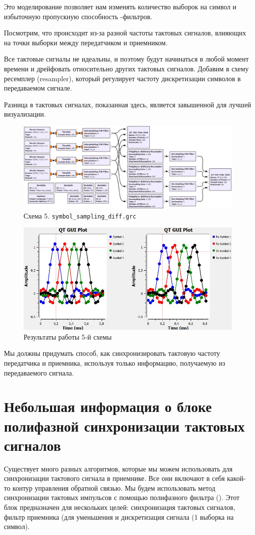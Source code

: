 \documentclass[a4paper, 12pt]{report}
\begin{document}
	Это моделирование позволяет нам изменять количество выборок на символ и избыточную пропускную способность -фильтров.

	Посмотрим, что происходит из-за разной частоты тактовых сигналов, влияющих на точки выборки между передатчиком и приемником.
	
	Все тактовые сигналы не идеальны, и поэтому будут начинаться в любой момент времени и дрейфовать относительно других тактовых сигналов. Добавим в схему ресемплер (resampler), который регулирует частоту дискретизации символов в передаваемом сигнале.
	
	Разница в тактовых сигналах, показанная здесь, является завышенной для лучшей визуализации.
	\begin{figure}[H]
		\centering
		\includegraphics[width=1.0\textwidth]{12.jpg}
		\caption{Схема 5. \texttt{symbol\_sampling\_diff.grc}}
		\label{fig:12}
	\end{figure}
	\begin{figure}[H]
		\centering
		\includegraphics[width=1.0\textwidth]{13.jpg}
		\caption{Результаты работы 5-й схемы}
		\label{fig:13}
	\end{figure}
	Мы должны придумать способ, как синхронизировать тактовую частоту передатчика и приемника, используя только информацию, получаемую из передаваемого сигнала.

	\chapter{Небольшая информация о блоке полифазной синхронизации тактовых сигналов}
	Существует много разных алгоритмов, которые мы можем использовать для синхронизации тактового сигнала в приемнике. Все они включают в себя какой-то контур управления обратной связью. Мы будем использовать метод синхронизации тактовых импульсов с помощью полифазного фильтра (). Этот блок предназначен для нескольких целей: синхронизация тактовых сигналов, фильтр приемника  (для уменьшения  и дискретизация сигнала (1 выборка на символ).
\end{document}
